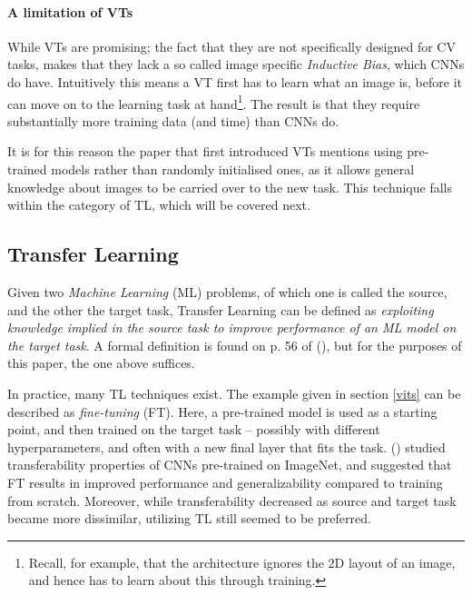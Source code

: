 \paragraph{A limitation of VTs}
While VTs are promising; the fact that they are not specifically designed for CV tasks, makes that they lack a so called image specific \textit{Inductive Bias}, which CNNs do have. Intuitively this means a VT first has to learn what an image is, before it can move on to the learning task at hand\footnote{Recall, for example, that the architecture ignores the 2D layout of an image, and hence has to learn about this through training.}. The result is that they require substantially more training data (and time) than CNNs do. 

It is for this reason the paper that first introduced VTs \citep{dosovitskiy2020image} mentions using pre-trained models rather than randomly initialised ones, as it allows general knowledge about images to be carried over to the new task. This technique falls within the category of TL, which will be covered next.


\subsection{Transfer Learning}
Given two \textit{Machine Learning} (ML) problems, of which one is called the source, and the other the target task, Transfer Learning can be defined as \textit{exploiting knowledge implied in the source task to improve performance of an ML model on the target task}. A formal definition is found on p. 56 of \citeauthor{sabatelli2022contributions} (\citeyear{sabatelli2022contributions}), but for the purposes of this paper, the one above suffices.

In practice, many TL techniques exist. The example given in section \ref{vits} can be described as \textit{fine-tuning} (FT). Here, a pre-trained model is used as a starting point, and then trained on the target task -- possibly with different hyperparameters, and often with a new final layer that fits the task. \citeauthor{yosinski2014transferable} (\citeyear{yosinski2014transferable}) studied transferability properties of CNNs pre-trained on ImageNet, and suggested that FT results in improved performance and generalizability compared to training from scratch. Moreover, while transferability decreased as source and target task became more dissimilar, utilizing TL still seemed to be preferred.

